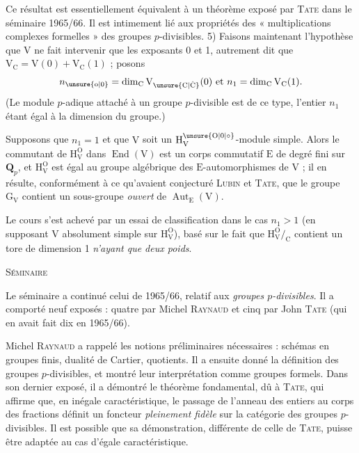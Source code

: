 Ce résultat est essentiellement équivalent à un théorème exposé par \textsc{Tate} dans le séminaire 1965/66. Il est intimement lié aux propriétés des « multiplications complexes formelles » des groupes $p$-divisibles.
5) Faisons maintenant l’hypothèse que $\mathrm{V}$ ne fait intervenir que les exposants 0 et 1, autrement dit que $\mathrm{V}_{\mathrm{C}}=\mathrm{V}(0)+\mathrm{V}_{\mathrm{C}}(1)$ ; posons
\[
n_{\unsure{\mathrm{o}|0}}=\dim_{\mathrm{C}}\mathrm{V}_{\unsure{\mathrm{C}|\dot{\mathrm{C}}}}(0)\ \text{et}\ n_1=\dim_{\mathrm{C}}\mathrm{V}_{\mathrm{C}}(1).
\]
(Le module $p$-adique attaché à un groupe $p$-divisible est de ce type, l’entier $n_1$ étant égal à la dimension du groupe.)

Supposons que $n_1=1$ et que $\mathrm{V}$ soit un $\mathrm{H}_{\mathrm{V}}^{\unsure{\mathrm{O}|0|\circ}}$-module simple. Alors le commutant de $\mathrm{H}_{\mathrm{V}}^{\mathrm{O}}$ dans $\operatorname{End}(\mathrm{V})$ est un corps commutatif $\mathrm{E}$ de degré fini sur $\mathbf{Q}_p$, et $\mathrm{H}_{\mathrm{V}}^{\mathrm{O}}$ est égal au groupe algébrique des $\mathrm{E}$-automorphismes de $\mathrm{V}$ ; il en résulte, conformément à ce qu’avaient conjecturé \textsc{Lubin} et \textsc{Tate}, que le groupe $\mathrm{G}_{\mathrm{V}}$ contient un sous-groupe \textit{ouvert} de $\operatorname{Aut}_{\mathrm{E}}(\mathrm{V})$.

Le cours s’est achevé par un essai de classification dans le cas $n_1>1$ (en supposant $\mathrm{V}$ absolument simple sur $\mathrm{H}_{\mathrm{V}}^{\mathrm{O}}$), basé sur le fait que $\mathrm{H}_{\mathrm{V}}^{\mathrm{O}}/_{\mathrm{C}}$ contient un tore de dimension 1 \textit{n’ayant que deux poids}.
\margin{\handwritten{$\left.\vphantom{\begin{matrix}1\\1\end{matrix}}\right]$ voir à ce sujet le livre de T. Springer sur \unsure{les|ls} alg. de Jordan récemment paru chez Springer-Verlag}}

\begin{center}\textsc{Séminaire}\end{center}

Le séminaire a continué celui de 1965/66, relatif aux \textit{groupes $p$-divisibles}. Il a comporté neuf exposés : quatre par Michel \textsc{Raynaud} et cinq par John \textsc{Tate} (qui en avait fait dix en 1965/66).

Michel \textsc{Raynaud} a rappelé les notions préliminaires nécessaires : schémas en groupes finis, dualité de Cartier, quotients. Il a ensuite donné la définition des groupes $p$-divisibles, et montré leur interprétation comme groupes formels. Dans son dernier exposé, il a démontré le théorème fondamental, dû à \textsc{Tate}, qui affirme que, en inégale caractéristique, le passage de l’anneau des entiers au corps des fractions définit un foncteur \textit{pleinement fidèle} sur la catégorie des groupes $p$-divisibles. Il est possible que sa démonstration, différente de celle de \textsc{Tate}, puisse être adaptée au cas d’égale caractéristique.

